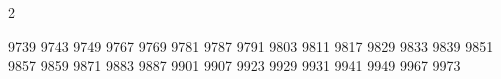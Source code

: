 \documentclass{article}
\begin{document}
\begin{multicols}{2}
\vfill

9739
9743
9749
9767
9769
9781
9787
9791
9803
9811
9817
9829
9833
9839
9851
9857
9859
9871
9883
9887
9901
9907
9923
9929
9931
9941
9949
9967
9973

\vfill


\end{multicols}
\end{document}
